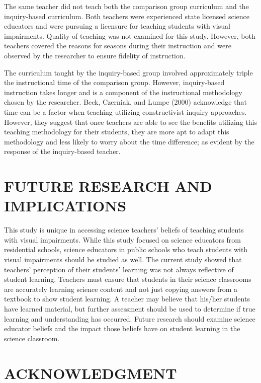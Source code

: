 \documentclass[11.5pt]{sig-alternate} %
\begin{document}
\begin{large}
The same teacher did not teach both the comparison group curriculum and the inquiry-based curriculum. Both teachers were experienced state licensed science educators and were pursuing a licensure for teaching students with visual impairments.  Quality of teaching was not examined for this study.  However, both teachers covered the reasons for seasons during their instruction and were observed by the researcher to ensure fidelity of instruction.

The curriculum taught by the inquiry-based group involved approximately triple the instructional time of the comparison group. However, inquiry-based instruction takes longer and is a component of the instructional methodology chosen by the researcher. Beck, Czerniak, and Lumpe (2000) acknowledge that time can be a factor when teaching utilizing constructivist inquiry approaches.  However, they suggest that once teachers are able to see the benefits utilizing this teaching methodology for their students, they are more apt to adapt this methodology and less likely to worry about the time difference; as evident by the response of the inquiry-based teacher.   

\section*{FUTURE RESEARCH AND IMPLICATIONS}
	
This study is unique in accessing science teachers’ beliefs of teaching students with visual impairments.  While this study focused on science educators from residential schools, science educators in public schools who teach students with visual impairments should be studied as well.  The current study showed that teachers’ perception of their students’ learning was not always reflective of student learning.  Teachers must ensure that students in their science classrooms are accurately learning science content and not just copying answers from a textbook to show student learning.  A teacher may believe that his/her students have learned material, but further assessment should be used to determine if true learning and understanding has occurred.  Future research should examine science educator beliefs and the impact those beliefs have on student learning in the science classroom.

\section*{ACKNOWLEDGMENT}
 

\end{large}
\end{document}
